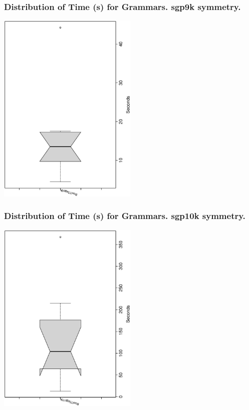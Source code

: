 \documentclass[18pt,c]{beamer}
\begin{document}
 \begin{frame}
 \frametitle{ Distribution of Time (s) for Grammars. sgp9k  symmetry. }
 \begin{center}
\includegraphics[width=0.5\textwidth, angle=-90]
{ExpFboxplottSeconds007.eps}
 \end{center}
 \label{ExpFboxplottSeconds007.eps}  
 \end{frame}

 \begin{frame}
 \frametitle{ Distribution of Time (s) for Grammars. sgp10k  symmetry. }
 \begin{center}
\includegraphics[width=0.5\textwidth, angle=-90]
{ExpFboxplottSeconds008.eps}
 \end{center}
 \label{ExpFboxplottSeconds008.eps}  
 \end{frame}
\end{document}
